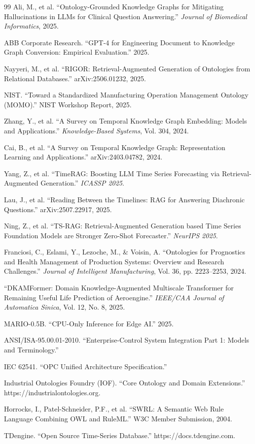 \documentclass[12pt,a4paper]{article}
\begin{document}
\begin{thebibliography}{99}
 Ali, M., et al. ``Ontology-Grounded Knowledge Graphs for Mitigating Hallucinations in LLMs for Clinical Question Answering.'' \emph{Journal of Biomedical Informatics}, 2025.

 ABB Corporate Research. ``GPT-4 for Engineering Document to Knowledge Graph Conversion: Empirical Evaluation.'' 2025.

 Nayyeri, M., et al. ``RIGOR: Retrieval-Augmented Generation of Ontologies from Relational Databases.'' arXiv:2506.01232, 2025.

 NIST. ``Toward a Standardized Manufacturing Operation Management Ontology (MOMO).'' NIST Workshop Report, 2025.

 Zhang, Y., et al. ``A Survey on Temporal Knowledge Graph Embedding: Models and Applications.'' \emph{Knowledge-Based Systems}, Vol. 304, 2024.

 Cai, B., et al. ``A Survey on Temporal Knowledge Graph: Representation Learning and Applications.'' arXiv:2403.04782, 2024.

 Yang, Z., et al. ``TimeRAG: Boosting LLM Time Series Forecasting via Retrieval-Augmented Generation.'' \emph{ICASSP 2025}.

 Lau, J., et al. ``Reading Between the Timelines: RAG for Answering Diachronic Questions.'' arXiv:2507.22917, 2025.

 Ning, Z., et al. ``TS-RAG: Retrieval-Augmented Generation based Time Series Foundation Models are Stronger Zero-Shot Forecaster.'' \emph{NeurIPS 2025}.

 Franciosi, C., Eslami, Y., Lezoche, M., \& Voisin, A. ``Ontologies for Prognostics and Health Management of Production Systems: Overview and Research Challenges.'' \emph{Journal of Intelligent Manufacturing}, Vol. 36, pp. 2223--2253, 2024.

 ``DKAMFormer: Domain Knowledge-Augmented Multiscale Transformer for Remaining Useful Life Prediction of Aeroengine.'' \emph{IEEE/CAA Journal of Automatica Sinica}, Vol. 12, No. 8, 2025.

 MARIO-0.5B. ``CPU-Only Inference for Edge AI.'' 2025.

 ANSI/ISA-95.00.01-2010. ``Enterprise-Control System Integration Part 1: Models and Terminology.''

 IEC 62541. ``OPC Unified Architecture Specification.''

 Industrial Ontologies Foundry (IOF). ``Core Ontology and Domain Extensions.'' https://industrialontologies.org.

 Horrocks, I., Patel-Schneider, P.F., et al. ``SWRL: A Semantic Web Rule Language Combining OWL and RuleML.'' W3C Member Submission, 2004.

 TDengine. ``Open Source Time-Series Database.'' https://docs.tdengine.com.

\end{thebibliography}
\end{document}
